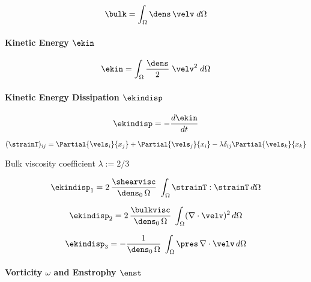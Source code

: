 \begin{equation}
\label{eq:bulk-motion}
    \bulk = \int_{\Omega} \dens\,\velv \; d\Omega
\end{equation}

\paragraph{Kinetic Energy $\ekin$}

\begin{equation}
\label{eq:ekin}
    \ekin = \int_\Omega \frac{\dens}{2} \; \velv^2 \; d\Omega
\end{equation}

\paragraph{Kinetic Energy Dissipation $\ekindisp$}

\begin{equation}
\label{eq:ekindisp}
    \ekindisp = -\frac{d\ekin}{dt} 
\end{equation}

\begin{equation}
\label{eq:straintensor}
    (\strainT)_{ij} = \Partial{\vels_i}{x_j} + \Partial{\vels_j}{x_i} - \lambda \delta_{ij} \Partial{\vels_k}{x_k}
\end{equation}

Bulk viscosity coefficient $\lambda := 2/3$

\begin{equation}
\label{eq:ekindisp1}
    \ekindisp_1 = 2\,\frac{\shearvisc}{\dens_0\,\Omega} \; \int_\Omega \strainT : \strainT \, d\Omega
\end{equation}

\begin{equation}
\label{eq:ekindisp2}
    \ekindisp_2 = 2\,\frac{\bulkvisc}{\dens_0\,\Omega} \; \int_\Omega (\nabla \cdot \velv)^2 \, d\Omega
\end{equation}

\begin{equation}
\label{eq:ekindisp3}
    \ekindisp_3 = -\frac{1}{\dens_0\,\Omega} \; \int_\Omega \pres \, \nabla \cdot \velv \, d\Omega
\end{equation}

\paragraph{Vorticity $\omega$ and Enstrophy $\enst$}

